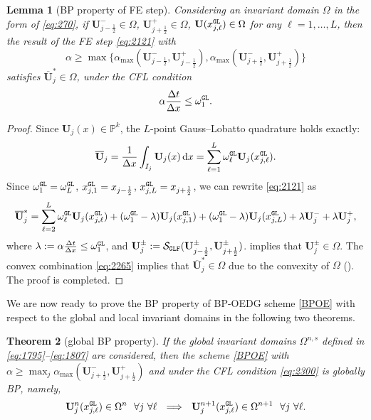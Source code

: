 \documentclass[times,final]{elsarticle}
\newtheorem{theorem}{Theorem}[section]
\newtheorem{lemma}[theorem]{Lemma}
\numberwithin{equation}{section}
\theoremstyle{definition}
\theoremstyle{remark}
\newcommand{\BU}{\mathbf{U}}
\newcommand{\oBU}{\overline{\BU}}
\begin{document}
\begin{lemma}[BP property of FE step]\label{lem:2154}
	Considering an invariant domain $\Omega$ in the form of \eqref{eq:270}, if 
	$\BU^{-}_{j-\frac12} \in \Omega$, $\BU^{+}_{j+\frac12} \in \Omega$, $\BU(x^{\tt GL}_{j,\ell}) \in \Omega$ for any $\ell = 1,\dots,L$,
	then the result of the FE step \eqref{eq:2121} with 
	\[
	\alpha \ge \max \big\{ \alpha_{\max}(\BU^{-}_{j-\frac12},\BU^{+}_{j-\frac12}), \alpha_{\max}(\BU^{-}_{j+\frac12},\BU^{+}_{j+\frac12}) \big\}
	\]
	satisfies $\oBU^*_j \in \Omega$, under the CFL condition 
	\begin{equation}\label{eq:2300}
		\alpha \frac{\Delta t}{\Delta x} \le \omega^{\tt GL}_1.
	\end{equation}
\end{lemma}

\begin{proof}
	Since $\BU_j(x) \in \mathbb{P}^k$, the $L$-point Gauss--Lobatto quadrature holds exactly:
	\[
	\oBU_j
	= \frac{1}{\Delta x} \int_{I_j} \BU_j(x) \, \textrm{d}x
	= \sum_{\ell = 1}^L \omega^{\tt GL}_\ell \BU_j(x^{\tt GL}_{j,\ell}).
	\]
	Since $\omega^{\tt GL}_1 = \omega^{\tt GL}_L$, $x^{\tt GL}_{j,1} = x_{j-\frac12}$, $x^{\tt GL}_{j,L} = x_{j+\frac12}$, we can rewrite \eqref{eq:2121} as
	\begin{equation}\label{eq:2265}
		\oBU^*_j
		=
		\sum_{\ell = 2}^L 
		\omega^{\tt GL}_\ell \BU_j(x^{\tt GL}_{j,\ell})
		+
		(\omega^{\tt GL}_1-\lambda)
		\BU_j(x^{\tt GL}_{j,1})
		+
		(\omega^{\tt GL}_1-\lambda)
		\BU_j(x^{\tt GL}_{j,L})
		+
		\lambda \BU_j^{-}
		+
		\lambda \BU_j^{+},
	\end{equation}
	where $\lambda := \alpha \frac{\Delta t}{\Delta x} \le \omega^{\tt GL}_1$, and
	$\BU_j^{\pm} := \mathcal{S}_{\tt GLF}(\BU^{\pm}_{j-\frac12},\BU^{\pm}_{j+\frac12})$.
	 implies that $\BU^{\pm}_j \in \Omega$. 
	The convex combination \eqref{eq:2265} implies that $\oBU^*_j \in \Omega$ due to the convexity of $\Omega$ ().
	The proof is completed.
\end{proof}

We are now ready to prove the BP property of BP-OEDG scheme \eqref{BPOE} with respect to the global and local invariant domains in the following two theorems.

\begin{theorem}[global BP property]\label{lem:2350}
	If the global invariant domains $\Omega^{n,s}$ defined in \eqref{eq:1795}--\eqref{eq:1807} are considered, then the scheme \eqref{BPOE} with $\alpha \ge \max_j \alpha_{\max}(\BU^-_{j+\frac12},\BU^+_{j+\frac12})$ and under the CFL condition \eqref{eq:2300} is globally BP, namely,
	\begin{equation}\label{eq:2177}
		\BU^n_j(x^{\tt GL}_{j,\ell}) \in \Omega^{n} 
		~~ \forall j ~ \forall \ell
		~~ \Longrightarrow ~~
		\BU^{n+1}_j(x^{\tt GL}_{j,\ell}) \in \Omega^{n+1} 
		~~ \forall j ~ \forall \ell.
	\end{equation}
	
\end{theorem}
\end{document}
